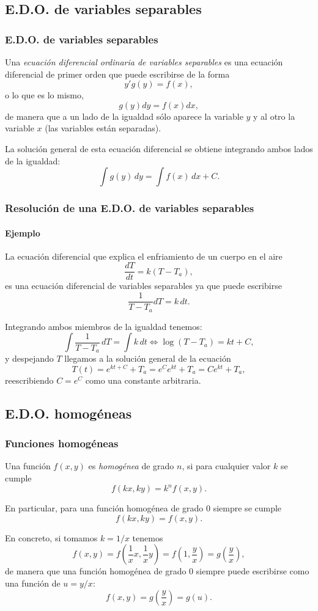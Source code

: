 \subsection{E.D.O. de variables separables}
\begin{frame}
\frametitle{E.D.O. de variables separables}
\begin{definicion}
Una \emph{ecuación diferencial ordinaria de variables separables} es una ecuación diferencial de primer orden que puede escribirse de la forma
\[y'g(y)=f(x),\]
o lo que es lo mismo,
\[g(y)dy=f(x)dx,\]
de manera que a un lado de la igualdad sólo aparece la variable $y$ y al otro la variable $x$ (las variables están separadas).
\end{definicion}

La solución general de esta ecuación diferencial se obtiene integrando ambos lados de la igualdad:
\[\int g(y)\,dy = \int f(x)\,dx+C.\]
\end{frame}


\begin{frame}
\frametitle{Resolución de una E.D.O. de variables separables}
\framesubtitle{Ejemplo}

La ecuación diferencial que explica el enfriamiento de un cuerpo en el aire 
\[\frac{dT}{dt}=k(T-T_a),\]
es una ecuación diferencial de variables separables ya que puede escribirse
\[\frac{1}{T-T_a}dT=k\,dt.\]

Integrando ambos miembros de la igualdad tenemos:
\[
\int \frac{1}{T-T_a}\,dT=\int k\,dt\Leftrightarrow \log(T-T_a)=kt+C,
\]
y despejando $T$ llegamos a la solución general de la ecuación
\[
T(t)=e^{kt+C}+T_a=e^Ce^{kt}+T_a=Ce^{kt}+T_a,
\]
reescribiendo $C=e^C$ como una constante arbitraria.
\end{frame}



\subsection{E.D.O. homogéneas}
\begin{frame}
\frametitle{Funciones homogéneas}
\begin{definicion}
Una función $f(x,y)$ es \emph{homogénea} de grado $n$, si para cualquier valor $k$ se cumple
\[f(kx,ky)= k^nf(x,y).\]
\end{definicion}

En particular, para una función homogénea de grado $0$ siempre se cumple  
\[f(kx,ky)=f(x,y).\]

En concreto, si tomamos $k=1/x$ tenemos
\[
f(x,y)=f\left(\frac{1}{x}x,\frac{1}{x}y\right)=f\left(1,\frac{y}{x}\right)=g\left(\frac{y}{x}\right),
\]
de manera que una función homogénea de grado $0$ siempre puede escribirse como una función de $u=y/x$:
\[f(x,y)=g\left(\frac{y}{x}\right)=g(u).\]
\end{frame}


